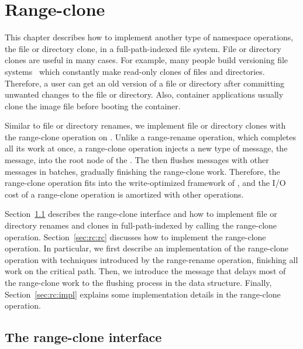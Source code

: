\chapter{Range-clone}
\label{chap:clone}

This chapter describes how to implement another type of namespace operations,
the file or directory clone, in a full-path-indexed file system.
File or directory clones are useful in many cases.
For example,
many people build versioning file systems~\citep{efs, cvfs, versionfs}
which constantly make read-only clones of files and directories.
Therefore, a user can get an old version of a file or directory after committing
unwanted changes to the file or directory.
Also, container applications usually clone the image file
before booting the container.

Similar to file or directory renames,
we implement file or directory clones with the range-clone operation on \bets.
Unlike a range-rename operation, which completes all its work at once,
a range-clone operation injects a new type of message, the \goto message,
into the root node of the \bet.
The \bet then flushes \goto messages with other messages in batches, gradually
finishing the range-clone work.
Therefore,
the range-clone operation fits into the write-optimized framework of \bets,
and the I/O cost of a range-clone operation is amortized with other operations.

Section~\ref{sec:rc:int} describes the range-clone interface and how to implement
file or directory renames and clones in full-path-indexed \betrfs by calling the
range-clone operation.
Section~\ref{sec:rc:rc} discusses how to implement the range-clone operation.
In particular, we first describe an implementation of the range-clone operation
with techniques introduced by the range-rename operation,
finishing all work on the critical path.
Then, we introduce the \goto message that delays most of the range-clone work
to the flushing process in the data structure.
Finally, Section~\ref{sec:rc:impl} explains some implementation details in the
range-clone operation.

\section{The range-clone interface}
\label{sec:rc:int}

